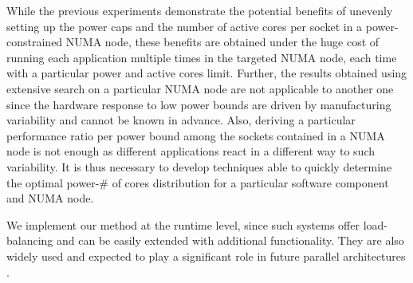 
While the previous experiments demonstrate the potential benefits of unevenly setting up
the power caps and the number of active cores per socket in a power-constrained NUMA node,
these benefits are obtained under the huge cost of running each application multiple times
in the targeted NUMA node, each time with a particular power and active cores limit.
Further, the results obtained using extensive search on a particular NUMA node are not
applicable to another one since the hardware response to low power bounds are driven by
manufacturing variability and cannot be known in advance.  Also, deriving a particular
performance ratio per power bound among the sockets contained in a NUMA node is not enough
as different applications react in a different way to such variability.  It is thus
necessary to develop techniques able to quickly determine the optimal power-\# of cores
distribution for a particular software component and NUMA node.

We implement our method at the runtime level, since such systems offer load-balancing and
can be easily extended with additional functionality.  They are also widely used and
expected to play a significant role in future parallel architectures \cite{JSFI19,
Casas2015}. 


